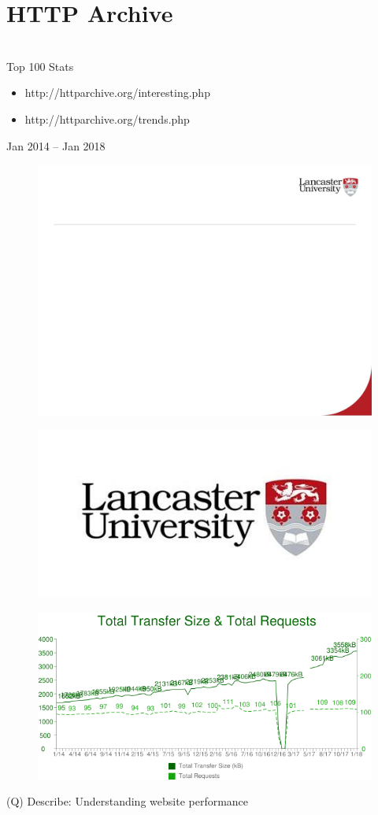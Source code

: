 \documentclass[12pt]{article}
\begin{document}
\section{HTTP Archive }
\\
Top 100 Stats\\
\begin{itemize}
  \item http://httparchive.org/interesting.php
  \item http://httparchive.org/trends.php
\end{itemize}
Jan 2014 – Jan 2018\\
\begin{figure}[H]
\includegraphics[width=0.5\linewidth]{page35-image-1.png}
\end{figure}
\begin{figure}[H]
\includegraphics[width=0.5\linewidth]{page35-image-2.png}
\end{figure}
\begin{figure}[H]
\includegraphics[width=0.5\linewidth]{page35-image-3.png}
\end{figure}
\clearpage
(Q)
Describe: Understanding website performance
\clearpage
\end{document}
